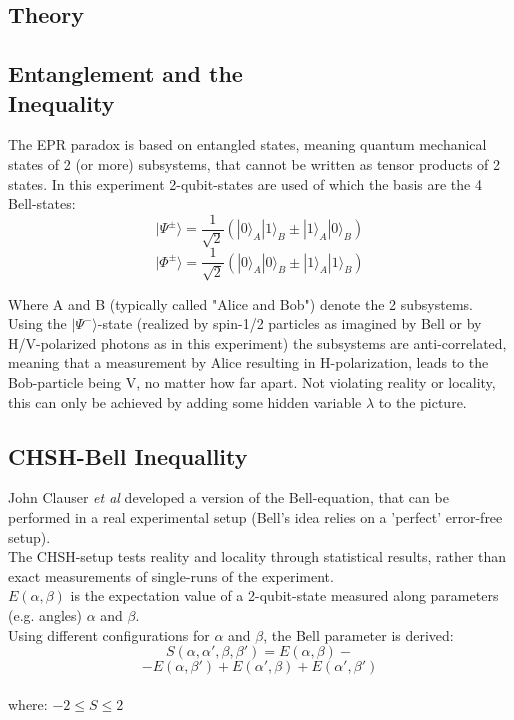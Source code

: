 \documentclass[12pt,a4paper]{article}
\begin{document}
\begin{multicols}{2}

\section{Theory}
\label{theory}

\subsection{Entanglement and the \\ Inequality}
The EPR paradox is based on entangled states, meaning quantum mechanical states of 2 (or more) subsystems, that cannot be written as tensor products of 2 states. In this experiment 2-qubit-states are used of which the basis are the 4 Bell-states:
$$|\Psi^{\pm}\rangle = \frac{1}{\sqrt{2}}(|0\rangle_A|1\rangle_B \pm |1\rangle_A|0\rangle_B)$$
$$|\Phi^{\pm}\rangle = \frac{1}{\sqrt{2}}(|0\rangle_A|0\rangle_B \pm |1\rangle_A|1\rangle_B)$$

\noindent Where A and B (typically called "Alice and Bob") denote the 2 subsystems.\\
Using the $|\Psi^{-}\rangle$-state (realized by spin-1/2 particles as imagined by Bell or by H/V-polarized photons as in this experiment) the subsystems are anti-correlated, meaning that a measurement by Alice resulting in H-polarization, leads to the Bob-particle being V, no matter how far apart. Not violating reality or locality, this can only be achieved by adding some hidden variable $\lambda$ to the picture.\\





\subsection{CHSH-Bell Inequallity}
John Clauser \textit{et al} developed a version of the Bell-equation, that can be performed in a real experimental setup (Bell's idea relies on a 'perfect' error-free setup).\\
The CHSH-setup tests reality and locality through statistical results, rather than exact measurements of single-runs of the experiment.\\
$E(\alpha, \beta)$ is the expectation value of a 2-qubit-state measured along parameters (e.g. angles) $\alpha$ and $\beta$.\\
Using different configurations for $\alpha$ and $\beta$, the Bell parameter is derived:
$$S(\alpha, \alpha', \beta, \beta') = E(\alpha, \beta) - $$
$$-E(\alpha, \beta') + E(\alpha', \beta) + E(\alpha', \beta')$$
\\
where:  $-2 \le S \le 2$


\end{multicols}
\end{document}
